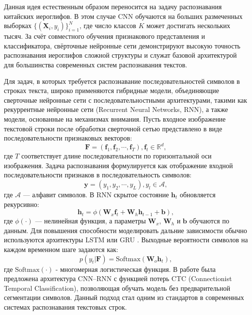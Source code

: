 Данная идея естественным образом переносится на задачу распознавания китайских иероглифов. В этом случае CNN обучаются на больших размеченных выборках \(\{(\mathbf{X}_i, y_i)\}_{i=1}^{N}\), где число классов $K$ может достигать нескольких тысяч. За счёт совместного обучения признакового представления и классификатора, свёрточные нейронные сети демонстрируют высокую точность распознавания иероглифов сложной структуры и служат базовой архитектурой для большинства современных систем распознавания текстов.

Для задач, в которых требуется распознавание последовательностей символов в строках текста, широко применяются гибридные модели, объединяющие сверточные нейронные сети с последовательностными архитектурами, такими как рекуррентные нейронные сети (Recurrent Neural Networks, RNN), а также модели, основанные на механизмах внимания. Пусть входное изображение текстовой строки после обработки сверточной сетью представлено в виде последовательности признаковых векторов:
\[
    \mathbf{F} = (\mathbf{f}_1, \mathbf{f}_2,\cdots,\mathbf{f}_T), \mathbf{f}_t\in\mathbb{R}^d,
\]
где $T$ соответствует длине последовательности по горизонтальной оси изображения. Задача распознавания формулируется как отображение входной последовательности признаков в последовательность символов:
\[
    \mathbf{y} = (y_1, y_2, \cdots, y_L), y_l \in \mathcal{A},
\]
где $\mathcal{A}$ — алфавит символов. В RNN скрытое состояние $\mathbf{h}_t$ обновляется рекурсивно:
\[
    \mathbf{h}_t = \phi(\mathbf{W}_x\mathbf{f}_t + \mathbf{W}_h\mathbf{h}_{t-1} + \mathbf{b}),
\]
где $\phi(\cdot)$ — нелинейная функция, а параметры $\mathbf{W}_x$, $\mathbf{W}_h$ и $\mathbf{b}$ обучаются по данным. Для повышения способности моделировать дальние зависимости обычно используются архитектуры LSTM \cite{greff2016lstm} или GRU \cite{chung2014empirical}. Выходные вероятности символов на каждом временном шаге задаются как:
\[
    p(y_t | \mathbf{F}) = \text{Softmax}(\mathbf{W}_o\mathbf{h}_t),
\]
где \(\text{Softmax}(\cdot)\) - многомерная логистическая функция. В работе \cite{shi2016end} была предложена архитектура CNN–RNN с функцией потерь CTC (Connectionist Temporal Classification), позволяющая обучать модель без предварительной сегментации символов. Данный подход стал одним из стандартов в современных системах распознавания текстовых строк.


